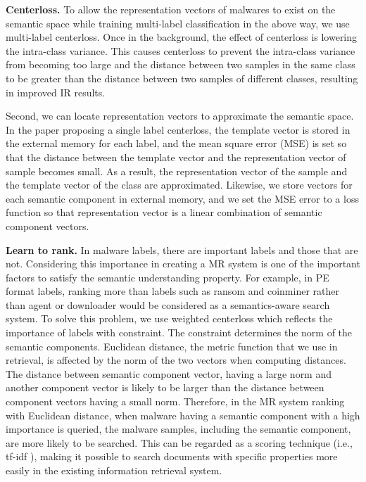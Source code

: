 \textbf{Centerloss. }
To allow the representation vectors of malwares to exist on the semantic space while training multi-label classification in the above way, we use multi-label centerloss. Once in the background, the effect of centerloss is lowering the intra-class variance. This causes centerloss to prevent the intra-class variance from becoming too large and the distance between two samples in the same class to be greater than the distance between two samples of different classes, resulting in improved IR results.

Second, we can locate representation vectors to approximate the semantic space. In the paper proposing a single label centerloss, the template vector is stored in the external memory for each label, and the mean square error (MSE) is set so that the distance between the template vector and the representation vector of sample becomes small. As a result, the representation vector of the sample and the template vector of the class are approximated. Likewise, we store vectors for each semantic component in external memory, and we set the MSE error to a loss function so that representation vector is a linear combination of semantic component vectors.




\textbf{Learn to rank. }
In malware labels, there are important labels and those that are not. Considering this importance in creating a MR system is one of the important factors to satisfy the semantic understanding property. For example, in PE format labels, ranking more than labels such as ransom and coinminer rather than agent or downloader would be considered as a semantics-aware search system. To solve this problem, we use weighted centerloss which reflects the importance of labels with constraint. The constraint determines the norm of the semantic components. Euclidean distance, the metric function that we use in retrieval, is affected by the norm of the two vectors when computing distances. The distance between semantic component vector, having a large norm and another component vector is likely to be larger than the distance between component vectors having a small norm. Therefore, in the MR system ranking with Euclidean distance, when malware having a semantic component with a high importance is queried, the malware samples, including the semantic component, are more likely to be searched. This can be regarded as a scoring technique (i.e., tf-idf \cite{baeza1999modern}), making it possible to search documents with specific properties more easily in the existing information retrieval system.
 

